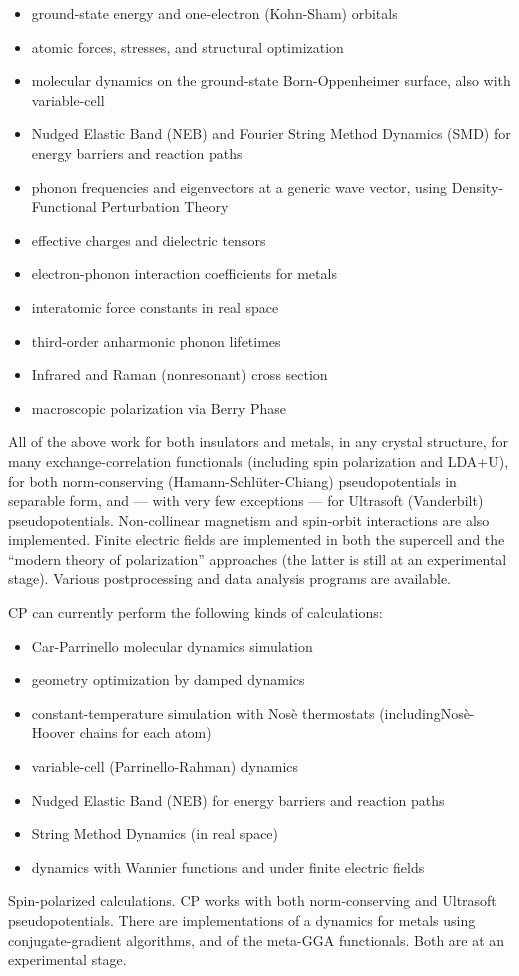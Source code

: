 \documentclass[12pt,a4paper]{article}
\begin{document}
\begin{itemize}
  \item ground-state energy and one-electron (Kohn-Sham) orbitals
  \item atomic forces, stresses, and structural optimization
  \item molecular dynamics on the ground-state Born-Oppenheimer
        surface, also with variable-cell
  \item Nudged Elastic Band (NEB) and Fourier String Method Dynamics (SMD)
        for energy barriers and reaction paths
  \item phonon frequencies and eigenvectors at a generic wave vector,
        using Density-Functional Perturbation Theory
  \item effective charges and dielectric tensors
  \item electron-phonon interaction coefficients for metals
  \item interatomic force constants in real space
  \item third-order anharmonic phonon lifetimes
  \item Infrared and Raman (nonresonant) cross section
  \item macroscopic polarization via Berry Phase
\end{itemize}
All of the above work for both insulators and metals, in any crystal
structure, for many exchange-correlation functionals (including spin
polarization and LDA+U), for both norm-conserving (Hamann-Schl\"uter-Chiang)
pseudopotentials in separable form, and --- with very few exceptions
--- for Ultrasoft (Vanderbilt) pseudopotentials.  Non-collinear
magnetism and spin-orbit interactions are also implemented.  Finite
electric fields are implemented in both the supercell and the 
``modern theory of polarization'' approaches (the latter is still 
at an experimental stage).
Various postprocessing and data analysis programs are available.

CP can currently perform the following kinds of calculations:

\begin{itemize}
  \item Car-Parrinello molecular dynamics simulation
  \item geometry optimization by damped dynamics
  \item constant-temperature simulation with Nos\`e thermostats
        (including\break Nos\`e-Hoover chains for each atom)
  \item variable-cell (Parrinello-Rahman) dynamics
  \item Nudged Elastic Band (NEB) for energy barriers and reaction
        paths
  \item String Method Dynamics (in real space)
  \item dynamics with Wannier functions and under finite electric
        fields 
\end{itemize}
Spin-polarized calculations.
CP works with both norm-conserving and Ultrasoft pseudopotentials.
There are implementations of a dynamics for metals using 
conjugate-gradient algorithms, and of the meta-GGA functionals.
Both are at an experimental stage.
\end{document}
